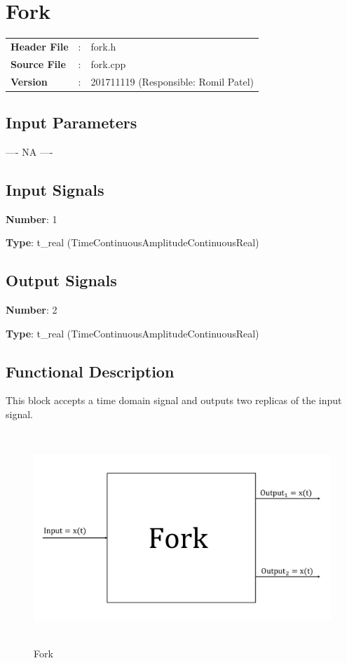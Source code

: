 \clearpage

\section{Fork}

\begin{tcolorbox}	
\begin{tabular}{p{2.75cm} p{0.2cm} p{10.5cm}} 	
\textbf{Header File}   &:& fork.h \\
\textbf{Source File}   &:& fork.cpp \\
\textbf{Version}       &:& 201711119 (Responsible: Romil Patel)
\end{tabular}
\end{tcolorbox}

\subsection*{Input Parameters}

---- NA ----

\subsection*{Input Signals}

\textbf{Number}: 1

\textbf{Type}: t\_real (TimeContinuousAmplitudeContinuousReal)

\subsection*{Output Signals}

\textbf{Number}: 2

\textbf{Type}: t\_real (TimeContinuousAmplitudeContinuousReal)

\subsection*{Functional Description}

This block accepts a time domain signal and outputs two replicas of the input signal.

\begin{figure}[h]
	\centering
	\includegraphics[width=1.0\textwidth, height=8cm]{./lib/fork/figures/fork.pdf}
	\caption{Fork}\label{}
\end{figure}